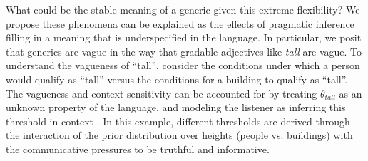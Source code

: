 \documentclass[10pt,letterpaper]{article}
\newcommand{\red}[1]{\textcolor{Red}{#1}}
\begin{document}
%
%
%
%

What could be the stable meaning of a generic given this extreme flexibility? We propose these phenomena can be explained as the effects of pragmatic inference filling in a meaning that is underspecified in the language. 
%
In particular, we posit that generics are vague in the way that gradable adjectives like \emph{tall} are vague. To understand the vagueness of ``tall'', consider the conditions under which a person would qualify as ``tall'' versus the conditions for a building to qualify as ``tall''.
The vagueness and context-sensitivity can be accounted for by treating $\theta_{tall}$ as an unknown property of the language, and modeling the listener as inferring this threshold in context \cite{Lassiter2015}. In this example, different thresholds are derived through the interaction of the prior distribution over heights (people vs. buildings) with the communicative pressures to be truthful and informative. 
 
\end{document}
